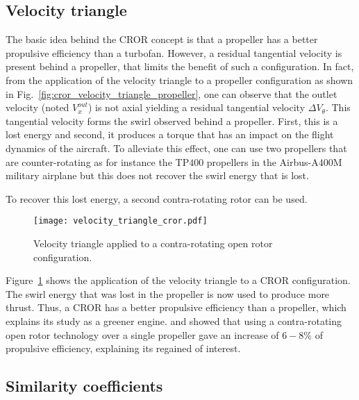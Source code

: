 \subsection{Velocity triangle}
\label{sub:cror_velocity_triangle}

The basic idea behind the CROR concept is that a propeller has a 
better propulsive efficiency than a turbofan. However,
a residual tangential velocity is present behind a propeller, that limits
the benefit of such a configuration.
In fact, from the application of the velocity triangle to a propeller configuration
as shown in Fig.~\ref{fig:cror_velocity_triangle_propeller}, one can
observe that the outlet velocity (noted $V^{out}_x$) is not axial
yielding a residual tangential velocity $\Delta V_{\theta}$. This tangential velocity forms
the swirl observed behind a propeller. First, this is a lost energy and
second, it produces a torque that has an impact on the flight dynamics
of the aircraft. To alleviate this effect, one can use two propellers
that are counter-rotating as for instance the TP$400$ propellers
in the Airbus-A$400$M military airplane but this does not recover
the swirl energy that is lost.

To recover this lost energy, a second contra-rotating rotor can be used.
\begin{figure}[htbp]
  \centering
  \texttt{[image: velocity\_triangle\_cror.pdf]}
  \caption{Velocity triangle applied to a contra-rotating open rotor configuration.}
  \label{fig:velocity_triangle_cror}
\end{figure}
Figure~\ref{fig:velocity_triangle_cror} shows the application
of the velocity triangle to a CROR configuration. The swirl
energy that was lost in the propeller is now used to 
produce more thrust. Thus, a CROR has a better propulsive
efficiency than a propeller, which explains its study as
a greener engine. \citet{Strack1981} and \citet{Hager1988} showed that
using a contra-rotating open rotor technology over
a single propeller gave an increase of $6-8\%$
of propulsive efficiency, explaining its regained of interest.

\subsection{Similarity coefficients}
\label{sub:cror_similarity_coeff}

